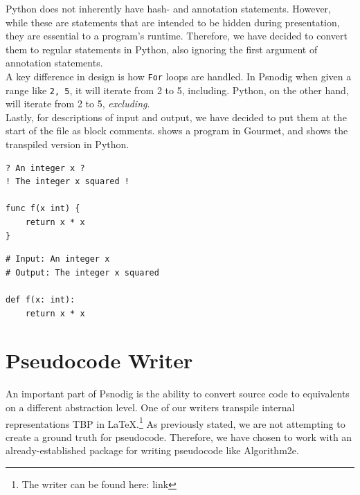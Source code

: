 Python does not inherently have hash- and annotation statements. However, while these are statements that are intended to be hidden during presentation, they are essential to a program's runtime. Therefore, we have decided to convert them to regular statements in Python, also ignoring the first argument of annotation statements. \\

A key difference in design is how \texttt{For} loops are handled. In Psnodig when given a range like \texttt{2, 5}, it will iterate from 2 to 5, including. Python, on the other hand, will iterate from 2 to 5, \textit{excluding}. \\

Lastly, for descriptions of input and output, we have decided to put them at the start of the file as block comments.  shows a program in Gourmet, and  shows the transpiled version in Python. \\

\begin{lstlisting}[caption={A Gourmet function where an input variable gets squared and returned.}, captionpos=b, label={gourmetSquareVariable}]
? An integer x ?
! The integer x squared !

func f(x int) {
    return x * x
}
\end{lstlisting}

\begin{lstlisting}[caption={The result of transpiling \Cref{gourmetSquareVariable} to Python with Psnodig}, captionpos=b, label={PythonResult}]
# Input: An integer x 
# Output: The integer x squared 

def f(x: int):
    return x * x
\end{lstlisting}

\section{Pseudocode Writer}

An important part of Psnodig is the ability to convert source code to equivalents on a different abstraction level. One of our writers transpile internal representations TBP in LaTeX.\footnote{The writer can be found here: link} As previously stated, we are not attempting to create a ground truth for pseudocode. Therefore, we have chosen to work with an already-established package for writing pseudocode like Algorithm2e. \\

